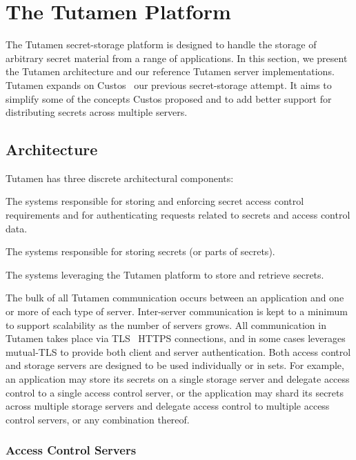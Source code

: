 \section{The Tutamen Platform}
\label{sec:tutamen}

The Tutamen secret-storage platform is designed to handle the storage
of arbitrary secret material from a range of applications.  In this
section, we present the Tutamen architecture and our reference Tutamen
server implementations. Tutamen expands on Custos~\cite{custos-trios}
our previous secret-storage attempt. It aims to simplify some of the
concepts Custos proposed and to add better support for distributing
secrets across multiple servers.

\subsection{Architecture}
\label{sec:tutamen:arch}

Tutamen has three discrete architectural components:

\begin{packed_desc}
\item[Access Control Servers (ACS):] The systems responsible for
  storing and enforcing secret access control requirements and for
  authenticating requests related to secrets and access control data.
\item[Storage Servers (SS):] The systems responsible for storing
  secrets (or parts of secrets).
\item[Applications:] The systems leveraging the Tutamen platform to
  store and retrieve secrets.
\end{packed_desc}

The bulk of all Tutamen communication occurs between an application
and one or more of each type of server. Inter-server communication is
kept to a minimum to support scalability as the number of servers
grows. All communication in Tutamen takes place via
TLS~\cite{dierks2008} HTTPS connections, and in some cases leverages
mutual-TLS to provide both client and server authentication. Both
access control and storage servers are designed to be used
individually or in sets. For example, an application may store its
secrets on a single storage server and delegate access control to a
single access control server, or the application may shard its secrets
across multiple storage servers and delegate access control to
multiple access control servers, or any combination thereof.

\subsubsection{Access Control Servers}
\label{sec:tutamen:arch:acs}

